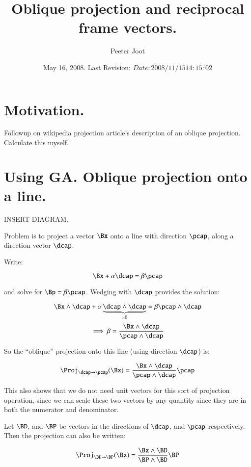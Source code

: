 \documentclass{article}      %
\title{ Oblique projection and reciprocal frame vectors. }
\author{Peeter Joot}         %
\date{ May 16, 2008.  Last Revision: $Date: 2008/11/15 14:15:02 $ }
\begin{document}

\maketitle{}

\tableofcontents

\section{ Motivation. }

Followup on wikipedia projection article's description of an oblique
projection.  Calculate this myself.

\section{ Using GA.  Oblique projection onto a line. }

INSERT DIAGRAM.

Problem is to project a vector $\Bx$ onto a line with direction $\pcap$, along a direction vector $\dcap$.

Write:

\begin{equation}\label{eqn:solveForprojLineUnit}
\Bx + \alpha \dcap = \beta \pcap
\end{equation}

and solve for $\Bp = \beta \pcap$.  Wedging with $\dcap$ provides the solution:

\[
\Bx \wedge \dcap + \alpha \underbrace{\dcap \wedge \dcap}_{=0} = \beta \pcap \wedge \dcap
\]
\[
\implies
\beta = \frac{\Bx \wedge \dcap}{\pcap \wedge \dcap}
\]

So the ``oblique'' projection onto this line (using direction $\dcap$) is:

\begin{equation}
\Proj_{\dcap \rightarrow \pcap}(\Bx) =
\frac{\Bx \wedge \dcap}{\pcap \wedge \dcap} \pcap
\end{equation}

This also shows that we do not need unit vectors for this sort of projection
operation, since we can scale these two vectors by any quantity since they are
in both the numerator and denominator.

Let $\BD$, and $\BP$ be vectors in the directions of $\dcap$, and $\pcap$ respectively.  Then the projection can also be written:

\begin{equation}\label{eqn:obliqueGAproj}
\Proj_{\BD \rightarrow \BP}(\Bx) =
\frac{\Bx \wedge \BD}{\BP \wedge \BD} \BP
\end{equation}
\end{document}

